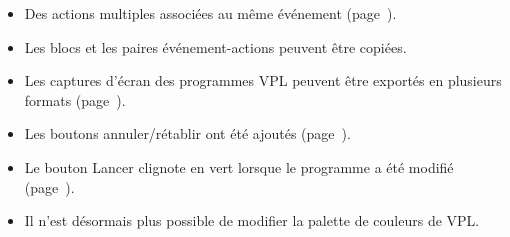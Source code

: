 \begin{itemize}

\item Des actions multiples associées au même événement (page~\pageref{p.copy-pairs}).

\item Les blocs et les paires événement-actions peuvent être copiées.

\item Les captures d'écran des programmes VPL peuvent être exportés en plusieurs formats (page~\pageref{p.proximity-sensitivity}).

\item Les boutons annuler/rétablir ont été ajoutés (page~\pageref{p.undo}).

\item Le bouton Lancer clignote en vert lorsque le programme a été modifié (page~\pageref{p.blink}).

\item Il n'est désormais plus possible de modifier la palette de couleurs de VPL.

\end{itemize}
